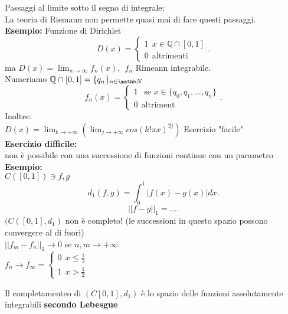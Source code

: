 \documentclass{article}
\begin{document}
	 Passaggi al limite sotto il segno di integrale:\\
	 La teoria di Riemann non permette quasi mai di fare questi passaggi. \\
	 \textbf{Esempio:} Funzione di Dirichlet\\
	 \[
	 D(x) = \begin{cases}
		 1 \ \ x\in\mathbb Q\cap [0,1]\\
		 0 \ \ \text{altrimenti}
	 \end{cases}
 .\]
 ma $D(x) = \lim_{n \rightarrow\infty} f_n(x), \ \ f_n$ Rimeann integrabile.\\
 Numeriamo $\mathbb Q\cap [0,1] = \{q_n\}_{n\in\mathb N}$\\
 \[
 f_n(x) = \begin{cases}
	 1 \ \ \text{ se } x\in\{q_0,q_1,\ldots,q_n\}\\
	 0 \ \ \text{altriment}
 \end{cases}
 .\] 
 Inoltre:\\
 $D(x) = \lim_{k \rightarrow +\infty} \left(\lim_{j \rightarrow +\infty} cos(k!\pi x)^{2j} \right)$ Esercizio "facile"\\
 \textbf{Esercizio difficile:}\\
 non è possibile con una successione di funzioni continue con un parametro\\
 \textbf{Esempio:}\\
 $C([0,1])\ni f,g$\\
 \[
 d_1(f,g) = \int_0^1|f(x)-g(x)|dx
 .\] 
 \[
 ||f-g||_1 = \ldots
 .\] 
 $(C([0,1],d_1)$ non è completo! (le successioni in questo spazio possono convergere al di fuori)\\
 $||f_m - f_n||_1 \rightarrow 0 $ se $n,m \rightarrow + \infty$\\
 $f_n \rightarrow f_\infty = \begin{cases}
 	0 \ \ x\leq \frac 12\\
	1 \ \ x > \frac 12
 \end{cases}$
 \begin{teo}
	 Il completamenteo di $(C[0,1],d_1)$ è lo spazio delle funzioni assolutamente integrabili \textbf{secondo Lebesgue}
 \end{teo}
\end{document}

